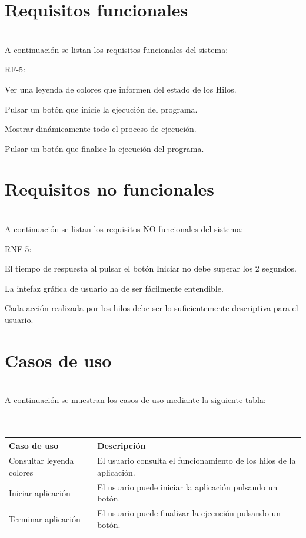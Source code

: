 \documentclass[12pt, a4paper, titlepage]{article}
\begin{document}
\section{Requisitos funcionales}
\noindent \\A continuación se listan los requisitos funcionales del sistema:\\
\begin{labeling}{ RF-5:} %
    \item[ \textbf{ RF-1}:] Ver una leyenda de colores que informen del estado de los Hilos.
    \item[ \textbf{ RF-2}:] Pulsar un botón que inicie la ejecución del programa.
    \item[ \textbf{ RF-3}:] Mostrar dinámicamente todo el proceso de ejecución.
    \item[ \textbf{ RF-4}:] Pulsar un botón que finalice la ejecución del programa.
\end{labeling}
\newpage

\section{Requisitos no funcionales}
\noindent \\A continuación se listan los requisitos NO funcionales del sistema:\\
\begin{labeling}{ RNF-5:}
    \item[ \textbf{RNF-1}:] El tiempo de respuesta al pulsar el botón Iniciar no debe superar los 2 segundos.
    \item[ \textbf{RNF-2}:] La intefaz gráfica de usuario ha de ser fácilmente entendible.
    \item[ \textbf{RNF-3}:] Cada acción realizada por los hilos debe ser lo suficientemente descriptiva para el usuario.
\end{labeling}
\newpage

\section{Casos de uso}
\noindent \\A continuación se muestran los casos de uso mediante la siguiente tabla:\\ \\ \\
\begin{tabular}{| m{5cm} | m{8cm} |} %
\hline %
\textbf{Caso de uso} & \textbf{Descripción} \\
\hline
Consultar leyenda colores & El usuario consulta el funcionamiento de los hilos de la aplicación. \\
\hline
Iniciar aplicación & El usuario puede iniciar la aplicación pulsando un botón. \\
\hline
Terminar aplicación & El usuario puede finalizar la ejecución pulsando un botón. \\
\hline
\end{tabular}
\newpage
\end{document}
